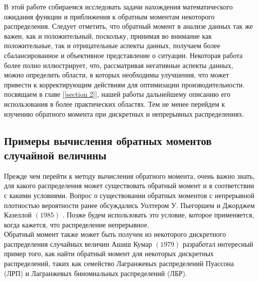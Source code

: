 \documentclass[13pt]{article}
\begin{document}
В этой работе собираемся исследовать задачи нахождения математического ожидания функции и приближения к обратным моментам некоторого распределения. Следует отметить, что обратный момент в анализе данных так же важен, как и положительный, поскольку, принимая во внимание как положительные, так и отрицательные аспекты данных, получаем более сбалансированное и объективное представление о ситуации. Некоторая работа более полно иллюстрирует, что, рассматривая негативные аспекты данных, можно определить области, в которых необходимы улучшения, что может привести к корректирующим действиям для оптимизации производительности. посвящаем в главе [\ref{section 2}], нашей работы дальнейшему описанию его использования в более практических областях. Тем не менее перейдем к изучению обратного момента при дискретных и непрерывных распределениях.
\subsection{Примеры вычисления обратных моментов случайной величины}\label{example}

Прежде чем перейти к методу вычисления обратного момента, очень важно знать, для какого распределения может существовать обратный момент и в соответствии с какими условиями. Вопрос о существовании обратных моментов с непрерывной плотностью вероятности ранее обсуждались Уолтером У. Пьегоршем и Джорджем Казеллой $(1985)$ \cite{piegorsch1985existence}. Позже будем использовать это условие, которое применяется, когда кажется, что распределение непрерывное.\\
Обратный момент также может быть получен из некоторого дискретного распределения случайных величин Ашиш Кумар $(1979)$ \cite{kumar1979negative} разработал интересный пример того, как найти обратный момент для некоторых дискретных распределений, таких как семейство Лагранжевых распределений Пуассона (ЛРП) и Лагранжевых биномиальных распределений (ЛБР).
\end{document}
